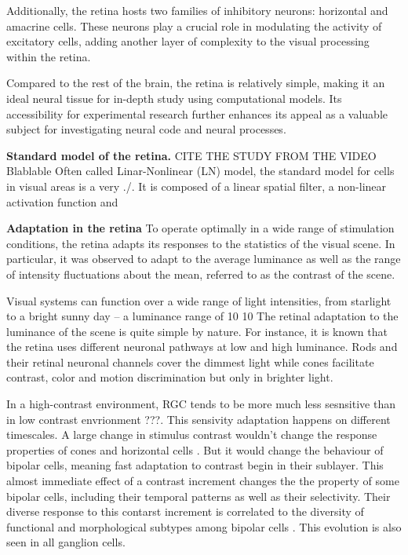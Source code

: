 Additionally, the retina hosts two families of inhibitory neurons: horizontal
and
amacrine cells. These neurons play a crucial role in modulating the activity of
excitatory cells, adding another layer of complexity to the visual processing
within the retina.

Compared to the rest of the brain, the retina is relatively simple,
making it an ideal neural tissue for in-depth study using computational models.
Its accessibility for experimental research further enhances its appeal as a
valuable subject for investigating neural code and neural processes.

\textbf{Standard model of the retina.}
CITE THE STUDY FROM THE VIDEO Blablable
Often called Linar-Nonlinear (LN) model, the standard model for cells in visual areas is a very ./.
It is composed of a linear spatial filter, a non-linear activation function and

\textbf{Adaptation in the retina}
To operate optimally in a wide range of
stimulation conditions, the retina adapts its responses to the statistics of
the visual scene.
In particular, it was observed to adapt to the average
luminance as well as the range of intensity fluctuations about the mean,
referred to as the contrast of the scene.

Visual systems can function over a wide range of light intensities, from
starlight to a bright sunny day – a luminance range of 10 10
The retinal adaptation to the luminance of the scene is quite simple by nature.
For instance, it is known that the retina uses different neuronal
pathways at low and high luminance. Rods and their retinal neuronal channels
cover the dimmest light while cones facilitate contrast, color and motion
discrimination but only in brighter light.

In a high-contrast environment, RGC tends to be more much less sesnsitive than
in low contrast envrionment \cite{} ???.
This sensivity adaptation happens on different timescales.
A large change in stimulus contrast wouldn't change the response properties of
cones and horizontal cells \cite{}. But it would change the behaviour of
bipolar cells, meaning fast adaptation to contrast begin in their sublayer.
This almost immediate effect of a contrast increment changes the the property
of some bipolar cells, including their temporal patterns as well as their
selectivity. Their diverse response to this contarst increment
is correlated to the diversity of functional and morphological subtypes among
bipolar cells \cite{baccus_fast_2002}.
This evolution is also seen in all ganglion cells.

